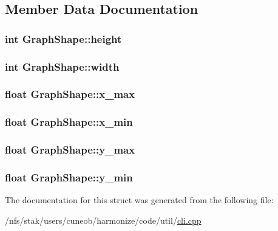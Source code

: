 \subsection{Member Data Documentation}
\hypertarget{structGraphShape_a607700d99c4abf129b8d16faf0d3b25c}{
\subsubsection[{height}]{\setlength{\rightskip}{0pt plus 5cm}int Graph\-Shape\-::height}}\label{structGraphShape_a607700d99c4abf129b8d16faf0d3b25c}
\hypertarget{structGraphShape_ad3178b15a9e77e1090d48c82d4638f9b}{
\subsubsection[{width}]{\setlength{\rightskip}{0pt plus 5cm}int Graph\-Shape\-::width}}\label{structGraphShape_ad3178b15a9e77e1090d48c82d4638f9b}
\hypertarget{structGraphShape_a3b00b051c184055de820b55bf4c18501}{
\subsubsection[{x\-\_\-max}]{\setlength{\rightskip}{0pt plus 5cm}float Graph\-Shape\-::x\-\_\-max}}\label{structGraphShape_a3b00b051c184055de820b55bf4c18501}
\hypertarget{structGraphShape_a1884e3c2754221989d63df9ac4ce4d9a}{
\subsubsection[{x\-\_\-min}]{\setlength{\rightskip}{0pt plus 5cm}float Graph\-Shape\-::x\-\_\-min}}\label{structGraphShape_a1884e3c2754221989d63df9ac4ce4d9a}
\hypertarget{structGraphShape_aed350263077af239c11e08625e1af5d7}{
\subsubsection[{y\-\_\-max}]{\setlength{\rightskip}{0pt plus 5cm}float Graph\-Shape\-::y\-\_\-max}}\label{structGraphShape_aed350263077af239c11e08625e1af5d7}
\hypertarget{structGraphShape_ab8dd54492c937c50ea4251830a29bde3}{
\subsubsection[{y\-\_\-min}]{\setlength{\rightskip}{0pt plus 5cm}float Graph\-Shape\-::y\-\_\-min}}\label{structGraphShape_ab8dd54492c937c50ea4251830a29bde3}


The documentation for this struct was generated from the following file\-:\begin{DoxyCompactItemize}
\item 
/nfs/stak/users/cuneob/harmonize/code/util/\hyperlink{cli_8cpp}{cli.\-cpp}\end{DoxyCompactItemize}
